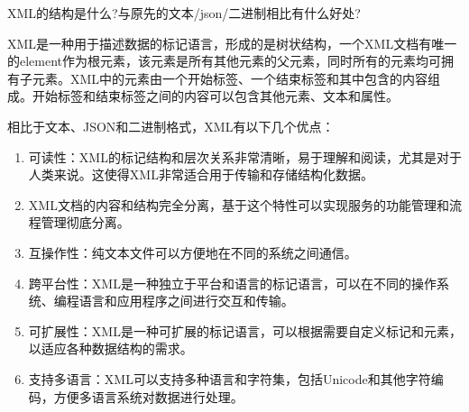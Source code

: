 \begin{problem}
XML的结构是什么?与原先的文本/json/二进制相比有什么好处?
\end{problem}

\begin{solution}
XML是一种用于描述数据的标记语言，形成的是树状结构，一个XML文档有唯一的element作为根元素，该元素是所有其他元素的父元素，同时所有的元素均可拥有子元素。XML中的元素由一个开始标签、一个结束标签和其中包含的内容组成。开始标签和结束标签之间的内容可以包含其他元素、文本和属性。

相比于文本、JSON和二进制格式，XML有以下几个优点：
\begin{enumerate}[label=\arabic*.]
    \item 可读性：XML的标记结构和层次关系非常清晰，易于理解和阅读，尤其是对于人类来说。这使得XML非常适合用于传输和存储结构化数据。
    \item XML文档的内容和结构完全分离，基于这个特性可以实现服务的功能管理和流程管理彻底分离。
    \item 互操作性：纯文本文件可以方便地在不同的系统之间通信。
    \item 跨平台性：XML是一种独立于平台和语言的标记语言，可以在不同的操作系统、编程语言和应用程序之间进行交互和传输。
    \item 可扩展性：XML是一种可扩展的标记语言，可以根据需要自定义标记和元素，以适应各种数据结构的需求。
    \item 支持多语言：XML可以支持多种语言和字符集，包括Unicode和其他字符编码，方便多语言系统对数据进行处理。
\end{enumerate}

\end{solution}